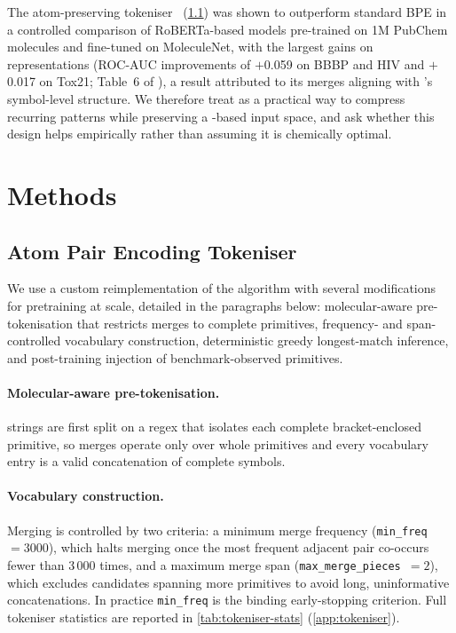 \documentclass[11pt,a4paper]{article}
\begin{document}
The atom-preserving \ape{} tokeniser~\citep{leonComparingSMILESSELFIES2024}
(\cref{sec:ape-tokeniser}) was shown to outperform standard BPE in a controlled
comparison of RoBERTa-based models pre-trained on 1M PubChem molecules and
fine-tuned on MoleculeNet, with the largest gains on \selfies{} representations
(ROC-AUC improvements of $+$0.059 on BBBP and HIV and $+$0.017 on Tox21;
Table~6 of \citealt{leonComparingSMILESSELFIES2024}), a result attributed to
its merges aligning with \selfies{}'s symbol-level structure.
We therefore treat \ape{} as a practical way to compress recurring \selfies{}
patterns while preserving a \selfies{}-based input space, and ask whether this
design helps empirically rather than assuming it is chemically optimal.

\section{Methods}%
\label{sec:methods}


\subsection{Atom Pair Encoding Tokeniser}
\label{sec:ape-tokeniser}

We use a custom reimplementation of the \ape{} algorithm
\citep{leonComparingSMILESSELFIES2024,mayuareAPETokenizer} with
several modifications for \selfies{} pretraining at scale, detailed in the
paragraphs below: molecular-aware pre-tokenisation that restricts merges to
complete \selfies{} primitives, frequency- and span-controlled vocabulary
construction, deterministic greedy longest-match inference, and post-training
injection of benchmark-observed primitives.

\paragraph{Molecular-aware pre-tokenisation.}
\selfies{} strings are first split on a regex that isolates each complete
bracket-enclosed primitive, so merges operate only over whole \selfies{}
primitives and every vocabulary entry is a valid concatenation of complete
symbols.

\paragraph{Vocabulary construction.}
Merging is controlled by two criteria: a minimum merge frequency
(\texttt{min\_freq}~$=3000$), which halts merging once the most frequent
adjacent pair co-occurs fewer than 3\,000 times, and a maximum merge span
(\texttt{max\_merge\_pieces}~$=2$), which excludes candidates spanning more
primitives to avoid long, uninformative concatenations. In practice
\texttt{min\_freq} is the binding early-stopping criterion. Full tokeniser
statistics are reported in \cref{tab:tokeniser-stats} (\cref{app:tokeniser}).
\end{document}
